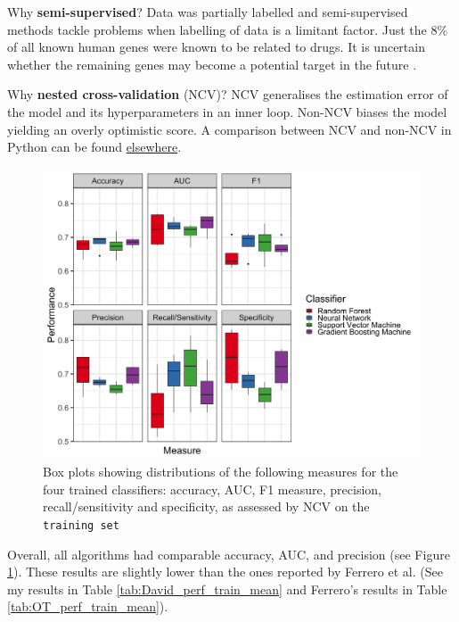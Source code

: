 Why \textbf{semi-supervised}? Data was partially labelled and semi-supervised methods tackle problems when labelling of data is a limitant factor. Just the 8\% of all known human genes were known to be related to drugs. It is uncertain whether the remaining genes may become a potential target in the future \cite{ferrero2017}. 
    
Why \textbf{nested cross-validation} (NCV)? NCV generalises the estimation error of the model and its hyperparameters in an inner loop. Non-NCV biases the model yielding an overly optimistic score. A comparison between NCV and non-NCV in Python can be found \href{https://goo.gl/soHYT7}{elsewhere}.

\begin{figure}[H]
    \centering
    \includegraphics[width = 13cm]{pics/BenchmarkOtherBoxplots.png}
    \caption{Box plots showing distributions of the following measures for the four trained classifiers: accuracy, AUC, F1 measure, precision, recall/sensitivity and specificity, as assessed by NCV on the \texttt{training set} \label{fig:OT_OtherPlots}}
\end{figure}

Overall, all algorithms had comparable accuracy, AUC, and precision (see Figure \ref{fig:OT_OtherPlots}). These results are slightly lower than the ones reported by Ferrero et al. \cite{ferrero2017} (See my results in Table \ref{tab:David_perf_train_mean} and Ferrero's results in Table \ref{tab:OT_perf_train_mean}). 

